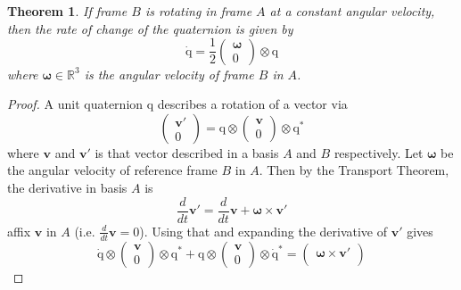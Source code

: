 \documentclass{amsart}
\newtheorem{theorem}{Theorem}[section]
\theoremstyle{definition}
\theoremstyle{remark}
\numberwithin{equation}{section}
\begin{document}
\begin{theorem}
  If frame $B$ is rotating in frame $A$ at a constant angular velocity, then the rate of change of the quaternion is given by
  \begin{equation}
    \mathrm{\dot{q}} = \frac{1}{2}
    \begin{pmatrix}
      \boldsymbol\omega\\
      0
    \end{pmatrix}
    \otimes \mathrm{q}
  \end{equation}
  where $\boldsymbol\omega\in\mathbb{R}^3$ is the angular velocity of frame $B$ in $A$.
\end{theorem}
\begin{proof}
  A unit quaternion $\mathrm{q}$ describes a rotation of a vector via
  \begin{equation}
    \begin{pmatrix}
      \mathbf{v}'\\
      0
    \end{pmatrix}
    = \mathrm{q} \otimes
    \begin{pmatrix}
      \mathbf{v} \\
      0
    \end{pmatrix}
    \otimes \mathrm{q}^*
  \end{equation}
  where $\mathbf{v}$ and $\mathbf{v}'$ is that vector described in a basis $A$ and $B$ respectively.
  Let $\boldsymbol\omega$ be the angular velocity of reference frame $B$ in $A$. Then by the Transport Theorem, the derivative in basis $A$ is
  \begin{equation}
    \frac{d}{dt} \mathbf{v}' = \frac{d}{dt} \mathbf{v} + \boldsymbol\omega \times \mathbf{v}'
  \end{equation}
  affix $\mathbf{v}$ in $A$ (i.e. $\frac{d}{dt}\mathbf{v}=0$).
  Using that and expanding the derivative of $\mathbf{v}'$ gives
  \begin{equation}
    \mathrm{\dot{q}} \otimes
    \begin{pmatrix}
      \mathbf{v} \\
      0
    \end{pmatrix}
    \otimes \mathrm{q}^* + \mathrm{q} \otimes
    \begin{pmatrix}
      \mathbf{v} \\
      0
    \end{pmatrix}
    \otimes \mathrm{\dot{q}^*} =
    \begin{pmatrix}
      \boldsymbol\omega\times\mathbf{v}' \\

\end{pmatrix}
\end{equation}
\end{proof}
\end{document}
